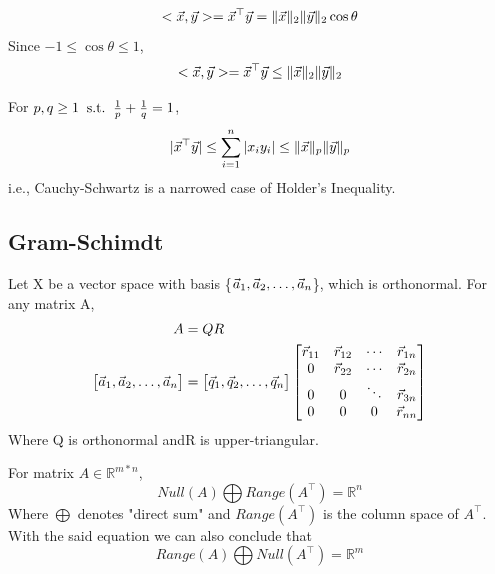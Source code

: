 \begin{theorem}
	\[
<\vec{x}, \vec{y}> = \vec{x}^\top\vec{y} = \|\vec{x}\|_2\|\vec{y}\|_2\cos \theta
	\]
	Since $-1 \le \cos \theta \le 1$,
	\[
<\vec{x}, \vec{y}> = \vec{x}^\top\vec{y} \le \|\vec{x}\|_2\|\vec{y}\|_2
	\]
\end{theorem}

\begin{theorem}
For $p,q\ge1 \;\;\text{s.t.}\;\; \frac{1}{p}+\frac{1}{q}=1$,
\[
|\vec{x}^\top\vec{y}|\le \sum_{i=1}^n|x_iy_i|\le \|\vec{x}\|_p\|\vec{y}\|_p
\]
i.e., Cauchy-Schwartz is a narrowed case of Holder's Inequality.
\end{theorem}


\subsection{Gram-Schimdt} %
\label{sub:gram_schimdt}

\begin{theorem}
	Let X be a vector space with basis \{${\vec{a}}_1,{\vec{a}}_2, \ldots, {\vec{a}}_{n}$\}, which is orthonormal.
	For any matrix A,
	\begin{align*}
		A &= QR\\
		\begin{bmatrix}
			{\vec{a}}_1,{\vec{a}}_2, \ldots, {\vec{a}}_{n}
		\end{bmatrix} &=
		\begin{bmatrix}
			{\vec{q}}_1,{\vec{q}}_2, \ldots, {\vec{q}}_{n}
		\end{bmatrix}
		\begin{bmatrix}
			\vec{r}_{11} & \vec{r}_{12} & \cdots & \vec{r}_{1n}\\
			0 & \vec{r}_{22} & \cdots & \vec{r}_{2n} \\
			0 & 0 & \ddots & \vec{r}_{3n} \\
			0 & 0 & 0 & \vec{r}_{nn}
		\end{bmatrix}
	\end{align*}
	Where Q is orthonormal andR is upper-triangular.
\end{theorem}

\begin{theorem}
For matrix $A\in \mathbb{R}^{m*n}$,
	\[
Null(A)\bigoplus Range(A^\top) = \mathbb{R}^n
	\]
Where $\bigoplus$ denotes "direct sum" and $Range(A^\top)$ is the column space of $A^\top$. With the said equation we can also conclude that
\[
Range(A)\bigoplus Null(A^\top) = \mathbb{R}^m
\]
\end{theorem}

